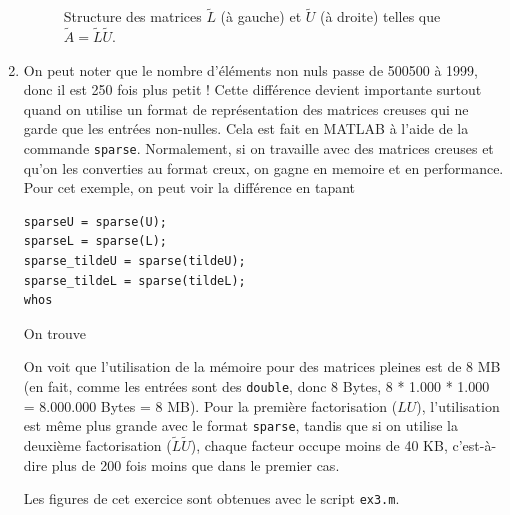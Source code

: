 \begin{enumerate}[label=\alph*)]
\begin{figure}[h!]
\begin{subfigure}[b]{0.5\linewidth}
     \end{subfigure} 
     \caption{Structure des matrices $\tilde{L}$ (à gauche) et $\tilde{U}$ (à droite) telles que $\tilde{A} = \tilde{L} \tilde{U}$.}
     \label{fig:tildelu}
   \end{figure}  
   
   
   
   \item On peut noter que le nombre d'éléments non nuls passe de 500500 à 1999, donc il est 250 fois plus petit !
         Cette différence devient importante surtout quand on utilise un format de représentation des matrices creuses qui ne garde que les entrées non-nulles.
         Cela est fait en \textsc{MATLAB} à l'aide de la commande \texttt{sparse}.
         Normalement, si on travaille avec des matrices creuses et qu'on les converties au format creux, on gagne en memoire et en performance.
         Pour cet exemple, on peut voir la différence en tapant
         
\begin{verbatim}
sparseU = sparse(U);
sparseL = sparse(L);
sparse_tildeU = sparse(tildeU);
sparse_tildeL = sparse(tildeL);
whos
\end{verbatim} 

On trouve




On voit que l'utilisation de la mémoire pour des matrices pleines est de 8 MB (en fait, comme les entrées sont des \texttt{double}, donc 8 Bytes, 8 * 1.000 * 1.000 = 8.000.000 Bytes = 8 MB).
Pour la première factorisation ($LU$), l'utilisation est même plus grande avec le format \texttt{sparse}, tandis que si on utilise la deuxième factorisation ($\tilde{L} \tilde{U}$), chaque facteur occupe moins de 40 KB, c'est-à-dire plus de 200 fois moins que dans le premier cas.


         
  
  Les figures de cet exercice sont obtenues avec le script \texttt{ex3.m}.

  





\end{enumerate}